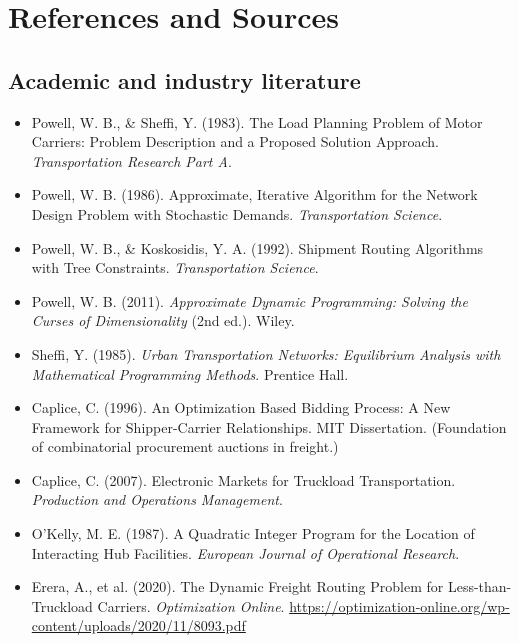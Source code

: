 \documentclass[11pt,a4paper]{article}
\theoremstyle{definition}
\begin{document}
\section{References and Sources}

\subsection*{Academic and industry literature}
\begin{itemize}[noitemsep]
  \item Powell, W. B., \& Sheffi, Y. (1983). The Load Planning Problem of Motor Carriers:
        Problem Description and a Proposed Solution Approach. \emph{Transportation Research
        Part A}.
  \item Powell, W. B. (1986). Approximate, Iterative Algorithm for the Network Design
        Problem with Stochastic Demands. \emph{Transportation Science}.
  \item Powell, W. B., \& Koskosidis, Y. A. (1992). Shipment Routing Algorithms with
        Tree Constraints. \emph{Transportation Science}.
  \item Powell, W. B. (2011). \emph{Approximate Dynamic Programming: Solving the Curses of
        Dimensionality} (2nd ed.). Wiley.
  \item Sheffi, Y. (1985). \emph{Urban Transportation Networks: Equilibrium Analysis with
        Mathematical Programming Methods}. Prentice Hall.
  \item Caplice, C. (1996). An Optimization Based Bidding Process: A New Framework for
        Shipper-Carrier Relationships. MIT Dissertation. (Foundation of combinatorial
        procurement auctions in freight.)
  \item Caplice, C. (2007). Electronic Markets for Truckload Transportation.
        \emph{Production and Operations Management}.
  \item O'Kelly, M. E. (1987). A Quadratic Integer Program for the Location of Interacting
        Hub Facilities. \emph{European Journal of Operational Research}.
  \item Erera, A., et al. (2020). The Dynamic Freight Routing Problem for Less-than-Truckload
        Carriers. \emph{Optimization Online}.
        \url{https://optimization-online.org/wp-content/uploads/2020/11/8093.pdf}
\end{itemize}
\end{document}
